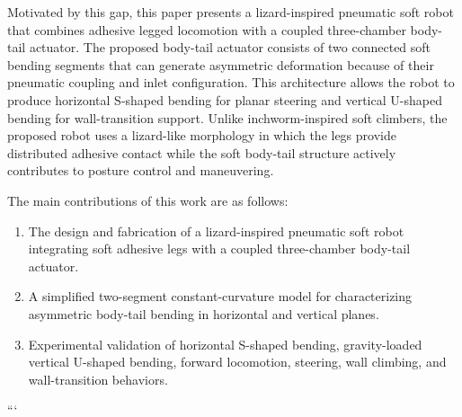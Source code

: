 Motivated by this gap, this paper presents a lizard-inspired pneumatic soft robot that combines adhesive legged locomotion with a coupled three-chamber body-tail actuator. The proposed body-tail actuator consists of two connected soft bending segments that can generate asymmetric deformation because of their pneumatic coupling and inlet configuration. This architecture allows the robot to produce horizontal S-shaped bending for planar steering and vertical U-shaped bending for wall-transition support. Unlike inchworm-inspired soft climbers, the proposed robot uses a lizard-like morphology in which the legs provide distributed adhesive contact while the soft body-tail structure actively contributes to posture control and maneuvering.

The main contributions of this work are as follows:
\begin{enumerate}
    \item The design and fabrication of a lizard-inspired pneumatic soft robot integrating soft adhesive legs with a coupled three-chamber body-tail actuator.
    \item A simplified two-segment constant-curvature model for characterizing asymmetric body-tail bending in horizontal and vertical planes.
    \item Experimental validation of horizontal S-shaped bending, gravity-loaded vertical U-shaped bending, forward locomotion, steering, wall climbing, and wall-transition behaviors.
\end{enumerate}
```